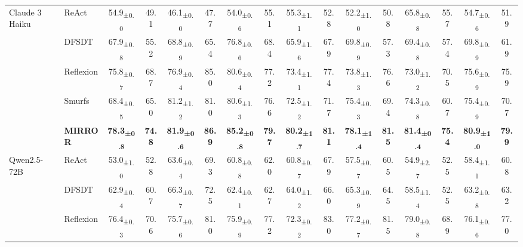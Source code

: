 \documentclass{article}
\begin{document}
\begin{table}[t]
\begin{adjustbox}{width=0.98\textwidth}
\begin{tabular}{@{}ll|cc|cc|cc|cc|cc|cc|cc@{}}
\midrule
\multirow{5}{*}{Claude 3 Haiku} & ReAct & 54.9\textsubscript{±0.0} & 49.1 & 46.1\textsubscript{±0.0} & 47.7 & 54.0\textsubscript{±0.6} & 55.1 & 55.3\textsubscript{±1.1} & 52.8 & 52.2\textsubscript{±1.0} & 50.8 & 65.8\textsubscript{±0.8} & 55.7 & 54.7\textsubscript{±0.6} & 51.9 \\
& DFSDT & 67.9\textsubscript{±0.8} & 55.2 & 68.8\textsubscript{±0.9} & 65.4 & 76.8\textsubscript{±0.6} & 68.4 & 65.9\textsubscript{±1.6} & 67.9 & 69.8\textsubscript{±0.9} & 57.3 & 69.4\textsubscript{±0.8} & 57.4 & 69.8\textsubscript{±0.9} & 61.9 \\
& Reflexion & 75.8\textsubscript{±0.7} & 68.7 & 76.9\textsubscript{±0.4} & 85.0 & 80.6\textsubscript{±0.4} & 77.2 & 73.4\textsubscript{±1.1} & 77.4 & 73.8\textsubscript{±1.3} & 76.6 & 73.0\textsubscript{±1.2} & 70.5 & 75.6\textsubscript{±0.9} & 75.9 \\
& Smurfs & 68.4\textsubscript{±0.5} & 65.0 & 81.2\textsubscript{±1.2} & 81.0 & 80.6\textsubscript{±1.3} & 76.6 & 72.5\textsubscript{±1.2} & 71.7 & 75.4\textsubscript{±0.3} & 69.4 & 74.3\textsubscript{±0.8} & 60.7 & 75.4\textsubscript{±0.9} & 70.7 \\
 &\cellcolor{green!18}\textbf{MIRROR} & \cellcolor{green!18}\textbf{78.3\textsubscript{±0.8}} & \cellcolor{green!18}\textbf{74.8} & \cellcolor{green!18}\textbf{81.9\textsubscript{±0.6}} & \cellcolor{green!18}\textbf{86.9} & \cellcolor{green!18}\textbf{85.2\textsubscript{±0.8}} & \cellcolor{green!18}\textbf{79.7} & \cellcolor{green!18}\textbf{80.2\textsubscript{±1.7}} & \cellcolor{green!18}\textbf{81.1} & \cellcolor{green!18}\textbf{78.1\textsubscript{±1.4}} & \cellcolor{green!18}\textbf{81.5} & \cellcolor{green!18}\textbf{81.4\textsubscript{±0.4}} & \cellcolor{green!18}\textbf{75.4} & \cellcolor{green!18}\textbf{80.9\textsubscript{±1.0}} & \cellcolor{green!18}\textbf{79.9} \\
\midrule
\multirow{5}{*}{Qwen2.5-72B} & ReAct & 53.0\textsubscript{±1.0} & 52.8 & 63.6\textsubscript{±0.4} & 69.3 & 60.8\textsubscript{±0.8} & 62.0 & 60.8\textsubscript{±0.7} & 67.9 & 57.5\textsubscript{±0.7} & 60.5 & 54.9\textsubscript{±2.7} & 52.5 & 58.4\textsubscript{±1.1} & 60.8 \\
& DFSDT & 62.9\textsubscript{±0.4} & 60.7 & 66.3\textsubscript{±0.7} & 72.5 & 62.4\textsubscript{±0.1} & 62.7 & 64.0\textsubscript{±1.2} & 66.0 & 65.3\textsubscript{±0.9} & 64.5 & 58.5\textsubscript{±1.4} & 52.5 & 63.2\textsubscript{±0.8} & 63.2 \\
& Reflexion & 76.4\textsubscript{±0.3} & 70.6 & 75.7\textsubscript{±0.6} & 81.0 & 75.9\textsubscript{±0.9} & 77.2 & 72.3\textsubscript{±0.2} & 83.0 & 77.2\textsubscript{±0.7} & 81.5 & 79.0\textsubscript{±0.8} & 68.9 & 76.1\textsubscript{±0.6} & 77.0 \\

\end{tabular}
\end{adjustbox}
\end{table}
\end{document}
